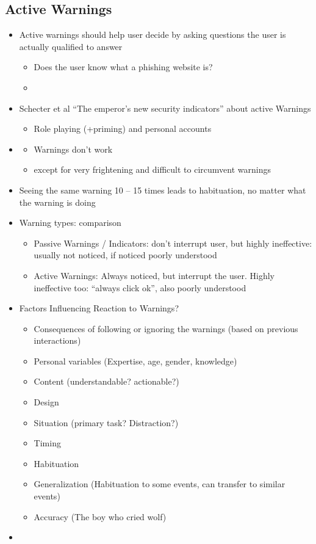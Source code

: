\documentclass[a4paper,12pt]{scrartcl}
\begin{document}
\subsection{Active Warnings}
\begin{itemize}
	\item
		Active warnings should help user decide by asking questions the user is actually qualified to answer
		\begin{itemize}
			\item
				Does the user know what a phishing website is?
			\item

		\end{itemize}
	\item
		Schecter et al \enquote{The emperor's new security indicators} about active Warnings
		\begin{itemize}
			\item
				Role playing (+priming) and personal accounts
		\end{itemize}
	\item
		\begin{itemize}
			\item
				Warnings don't work
			\item
				except for very frightening and difficult to circumvent warnings
		\end{itemize}
	\item
		Seeing the same warning 10 -- 15 times leads to habituation, no matter what the warning is doing
	\item
		Warning types: comparison
		\begin{itemize}
			\item
				Passive Warnings / Indicators: don't interrupt user, but highly ineffective: usually not noticed, if noticed poorly understood
			\item
				Active Warnings: Always noticed, but interrupt the user. Highly ineffective too: \enquote{always click ok}, also poorly understood
		\end{itemize}
	\item
		Factors Influencing Reaction to Warnings?
		\begin{itemize}
			\item
				Consequences of following or ignoring the warnings (based on previous interactions)
			\item
				Personal variables (Expertise, age, gender, knowledge)
			\item
				Content (understandable? actionable?)
			\item
				Design
			\item
				Situation (primary task? Distraction?)
			\item
				Timing
			\item
				Habituation
			\item
				Generalization (Habituation to some events, can transfer to similar events)
			\item
				Accuracy (The boy who cried wolf)
		\end{itemize}
	\item


\end{itemize}
\end{document}
